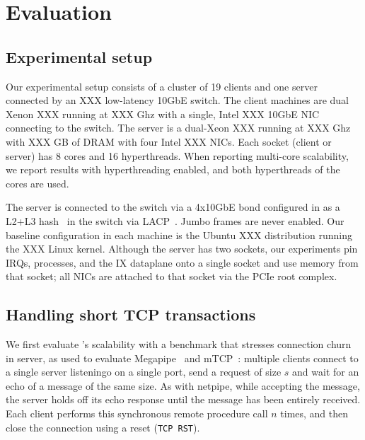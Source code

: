 
\section{Evaluation}
\label{sec:eval}

\subsection{Experimental setup}
\label{sec:eval:setup}


Our experimental setup consists of a cluster of 19 clients and one
server connected by an XXX low-latency 10GbE switch.  The client
machines are dual Xenon XXX running at XXX Ghz with a single, Intel
XXX 10GbE NIC connecting to the switch.  The server is a dual-Xeon XXX
running at XXX Ghz with XXX GB of DRAM with four Intel XXX NICs.  Each
socket (client or server) has 8 cores and 16 hyperthreads.  When
reporting multi-core scalability, we report results with
hyperthreading enabled, and both hyperthreads of the cores are used.

The server is connected to
the switch via a 4x10GbE bond configured in as a L2+L3
hash~\cite{missing} in the switch via LACP~\cite{ieee802.3ad}.  Jumbo
frames are never enabled.  Our baseline configuration in each machine
is the Ubuntu XXX distribution running the XXX Linux kernel.  Although
the server has two sockets, our experiments pin IRQs, processes, and
the IX dataplane onto a single socket and use memory from that socket;
all NICs are attached to that socket via the PCIe root complex.

\subsection{Handling short TCP transactions}



We first evaluate \ix's scalability with a benchmark that stresses
connection churn in server, as used to evaluate
Megapipe~\cite{han2012megapipe} and mTCP~\cite{jeong2014mtcp}:
multiple clients connect to a single server listeningo on a single
port, send a request of size $s$ and wait for an echo of a message of
the same size.  As with netpipe, while accepting the message, the server holds off its
echo response until the message has been entirely received.
Each client performs this synchronous remote procedure
call $n$ times, and then close the connection using a reset
(\texttt{TCP RST}).

